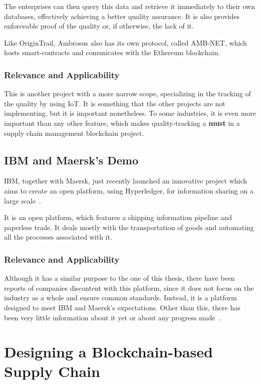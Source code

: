 The enterprises can then query this data and retrieve it immediately to their own databases, effectively achieving a better quality assurance. It is also provides enforceable proof of the quality or, if otherwise, the lack of it.

Like OriginTrail, Ambrosus also has its own protocol, called AMB-NET, which hosts smart-contracts and comunicates with the Ethereum blockchain.

\subsubsection{Relevance and Applicability}
This is another project with a more narrow scope, specializing in the tracking of the quality by using IoT. It is something that the other projects are not implementing, but it is important nonetheless. To some industries, it is even more important than any other feature, which makes quality-tracking a \textbf{must} in a supply chain management blockchain project.

\subsection{IBM and Maersk's Demo}
IBM, together with Maersk, just recently launched an innovative project which aims to create an open platform, using Hyperledger, for information sharing on a large scale~\cite{A.P.MOLLER-MAERSK}.

It is an open platform, which features a shipping information pipeline and paperless trade. It deals mostly with the transportation of goods and automating all the processes associated with it. 

\subsubsection{Relevance and Applicability}

Although it has a similar purpose to the one of this thesis, there have been reports of companies discontent with this platform, since it does not focus on the industry as a whole and ensure common standards. Instead, it is a platform designed to meet IBM and Maersk's expectations. Other than this, there has been very little information about it yet or about any progress made~\cite{Andersen2018}.

\section{Designing a Blockchain-based Supply Chain}

